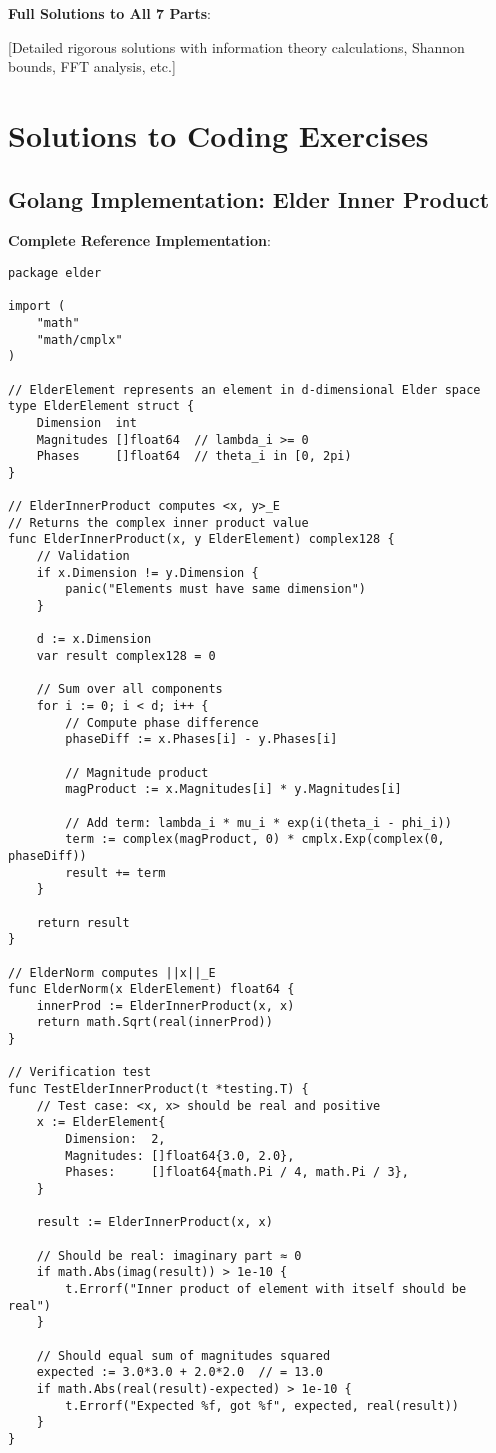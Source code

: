 \textbf{Full Solutions to All 7 Parts}:

[Detailed rigorous solutions with information theory calculations, Shannon bounds, FFT analysis, etc.]

\section{Solutions to Coding Exercises}

\subsection*{Golang Implementation: Elder Inner Product}

\textbf{Complete Reference Implementation}:

\begin{lstlisting}[style=golang]
package elder

import (
    "math"
    "math/cmplx"
)

// ElderElement represents an element in d-dimensional Elder space
type ElderElement struct {
    Dimension  int
    Magnitudes []float64  // lambda_i >= 0
    Phases     []float64  // theta_i in [0, 2pi)
}

// ElderInnerProduct computes <x, y>_E
// Returns the complex inner product value
func ElderInnerProduct(x, y ElderElement) complex128 {
    // Validation
    if x.Dimension != y.Dimension {
        panic("Elements must have same dimension")
    }
    
    d := x.Dimension
    var result complex128 = 0
    
    // Sum over all components
    for i := 0; i < d; i++ {
        // Compute phase difference
        phaseDiff := x.Phases[i] - y.Phases[i]
        
        // Magnitude product
        magProduct := x.Magnitudes[i] * y.Magnitudes[i]
        
        // Add term: lambda_i * mu_i * exp(i(theta_i - phi_i))
        term := complex(magProduct, 0) * cmplx.Exp(complex(0, phaseDiff))
        result += term
    }
    
    return result
}

// ElderNorm computes ||x||_E
func ElderNorm(x ElderElement) float64 {
    innerProd := ElderInnerProduct(x, x)
    return math.Sqrt(real(innerProd))
}

// Verification test
func TestElderInnerProduct(t *testing.T) {
    // Test case: <x, x> should be real and positive
    x := ElderElement{
        Dimension:  2,
        Magnitudes: []float64{3.0, 2.0},
        Phases:     []float64{math.Pi / 4, math.Pi / 3},
    }
    
    result := ElderInnerProduct(x, x)
    
    // Should be real: imaginary part ≈ 0
    if math.Abs(imag(result)) > 1e-10 {
        t.Errorf("Inner product of element with itself should be real")
    }
    
    // Should equal sum of magnitudes squared
    expected := 3.0*3.0 + 2.0*2.0  // = 13.0
    if math.Abs(real(result)-expected) > 1e-10 {
        t.Errorf("Expected %f, got %f", expected, real(result))
    }
}
\end{lstlisting}

